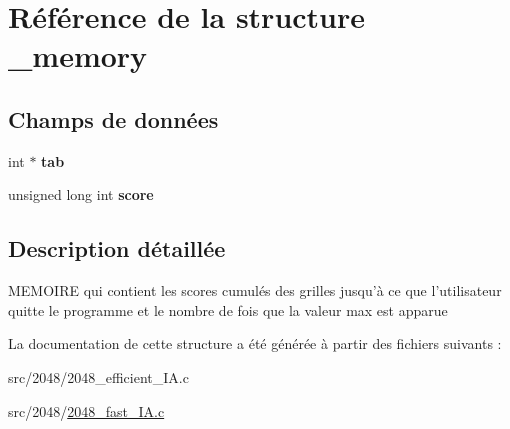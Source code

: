 \hypertarget{struct__memory}{
\section{Référence de la structure \_\-memory}
\label{struct__memory}
}
\subsection*{Champs de données}
\begin{DoxyCompactItemize}
\item 
\hypertarget{struct__memory_a269728afc56c8f66199335397f403bc8}{
int $\ast$ {\bfseries tab}}
\label{struct__memory_a269728afc56c8f66199335397f403bc8}

\item 
\hypertarget{struct__memory_afa23aef9d235eb9bd53c89f1a5179645}{
unsigned long int {\bfseries score}}
\label{struct__memory_afa23aef9d235eb9bd53c89f1a5179645}

\end{DoxyCompactItemize}


\subsection{Description détaillée}
MEMOIRE qui contient les scores cumulés des grilles jusqu'à ce que l'utilisateur quitte le programme et le nombre de fois que la valeur max est apparue 

La documentation de cette structure a été générée à partir des fichiers suivants :\begin{DoxyCompactItemize}
\item 
src/2048/2048\_\-efficient\_\-IA.c\item 
src/2048/\hyperlink{2048__fast___i_a_8c}{2048\_\-fast\_\-IA.c}\end{DoxyCompactItemize}
